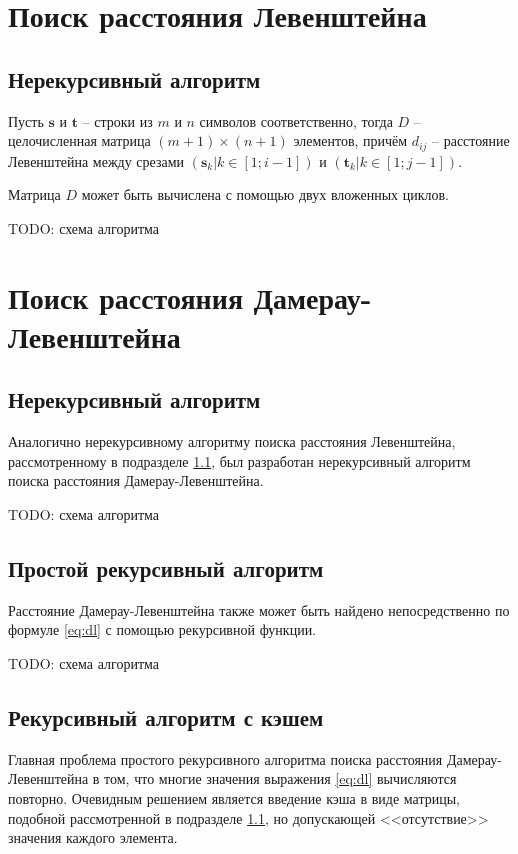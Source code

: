 \documentclass{report}
\begin{document}
\section{Поиск расстояния Левенштейна}

\subsection{Нерекурсивный алгоритм} \label{vl-iterative}

Пусть $\textbf{s}$ и $\textbf{t}$ -- строки из $m$ и $n$ символов
соответственно, тогда $D$ -- целочисленная матрица $(m + 1) \times
(n + 1)$ элементов, причём $d_{ij}$ -- расстояние Левенштейна между
срезами $(\textbf{s}_k | k \in [1; i - 1])$ и
$(\textbf{t}_k | k \in [1; j - 1])$.

Матрица $D$ может быть вычислена с помощью двух вложенных циклов.

TODO: схема алгоритма

\section{Поиск расстояния Дамерау-Левенштейна}

\subsection{Нерекурсивный алгоритм}

Аналогично нерекурсивному алгоритму поиска расстояния Левенштейна,
рассмотренному в подразделе \ref{vl-iterative}, был разработан
нерекурсивный алгоритм поиска расстояния Дамерау-Левенштейна.

TODO: схема алгоритма

\subsection{Простой рекурсивный алгоритм}

Расстояние Дамерау-Левенштейна также может быть найдено
непосредственно по формуле \ref{eq:dl} с помощью рекурсивной
функции.

TODO: схема алгоритма

\subsection{Рекурсивный алгоритм с кэшем}

Главная проблема простого рекурсивного алгоритма поиска расстояния
Дамерау-Левенштейна в том, что многие значения выражения
\ref{eq:dl} вычисляются повторно. Очевидным решением является
введение кэша в виде матрицы, подобной рассмотренной в подразделе
\ref{vl-iterative}, но допускающей <<отсутствие>> значения каждого
элемента.
\end{document}
